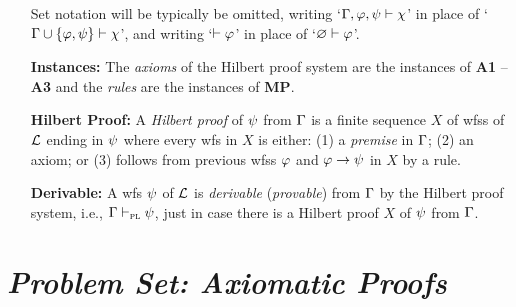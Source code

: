 \documentclass[a4paper, 11pt]{article} %
\begin{document}
\begin{enumerate}[leftmargin=1.2in,labelsep=.15in]
\begin{itemize}[leftmargin=.5in]
    \end{itemize}
    Set notation will be typically be omitted, writing `$\Gamma, \varphi, \psi \vdash \chi$' in place of `$\Gamma\cup\lbrace\varphi,\psi\rbrace \vdash \chi$', and writing `$\vdash \varphi$' in place of `$\varnothing \vdash\varphi$'.
    \item[\bf Instances:] The \textit{axioms} of the Hilbert proof system are the instances of \textbf{A1} -- \textbf{A3} and the \textit{rules} are the instances of \textbf{MP}.
    \item[\bf Hilbert Proof:] A \textit{Hilbert proof} of $\psi$ from $\Gamma$ is a finite sequence $X$ of wfss of $\mathcal{L}$ ending in $\psi$ where every wfs in $X$ is either: (1) a \textit{premise} in $\Gamma$; (2) an axiom; or (3) follows from previous wfss $\varphi$ and $\varphi \rightarrow \psi$ in $X$ by a rule.
    \item[\bf Derivable:]
      A wfs $\psi$ of $\mathcal{L}$ is \textit{derivable} (\textit{provable}) from $\Gamma$ by the Hilbert proof system, i.e., $\Gamma \vdash_{\textsc{pl}} \psi$, just in case there is a Hilbert proof $X$ of $\psi$ from $\Gamma$.
\end{enumerate}


\section*{\it Problem Set: Axiomatic Proofs}
\end{document}
